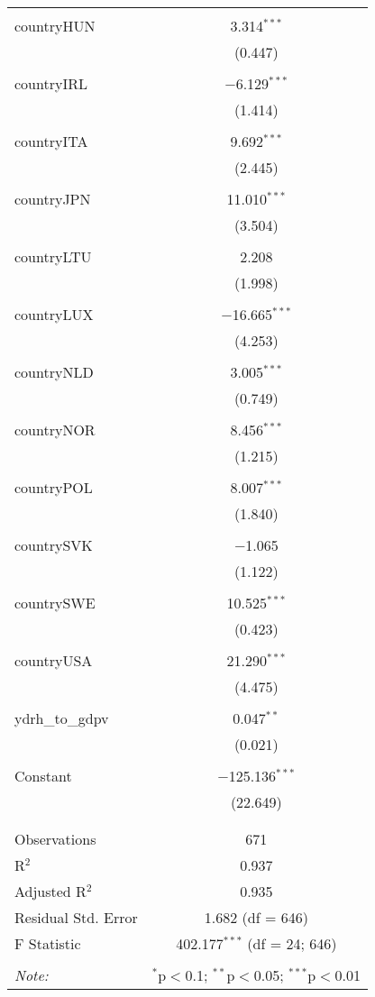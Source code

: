 \begin{table}[!htbp]
\begin{tabular}{@{\extracolsep{5pt}}lc}
  & \\ 
 countryHUN & 3.314$^{***}$ \\ 
  & (0.447) \\ 
  & \\ 
 countryIRL & $-$6.129$^{***}$ \\ 
  & (1.414) \\ 
  & \\ 
 countryITA & 9.692$^{***}$ \\ 
  & (2.445) \\ 
  & \\ 
 countryJPN & 11.010$^{***}$ \\ 
  & (3.504) \\ 
  & \\ 
 countryLTU & 2.208 \\ 
  & (1.998) \\ 
  & \\ 
 countryLUX & $-$16.665$^{***}$ \\ 
  & (4.253) \\ 
  & \\ 
 countryNLD & 3.005$^{***}$ \\ 
  & (0.749) \\ 
  & \\ 
 countryNOR & 8.456$^{***}$ \\ 
  & (1.215) \\ 
  & \\ 
 countryPOL & 8.007$^{***}$ \\ 
  & (1.840) \\ 
  & \\ 
 countrySVK & $-$1.065 \\ 
  & (1.122) \\ 
  & \\ 
 countrySWE & 10.525$^{***}$ \\ 
  & (0.423) \\ 
  & \\ 
 countryUSA & 21.290$^{***}$ \\ 
  & (4.475) \\ 
  & \\ 
 ydrh\_to\_gdpv & 0.047$^{**}$ \\ 
  & (0.021) \\ 
  & \\ 
 Constant & $-$125.136$^{***}$ \\ 
  & (22.649) \\ 
  & \\ 
\hline \\[-1.8ex] 
Observations & 671 \\ 
R$^{2}$ & 0.937 \\ 
Adjusted R$^{2}$ & 0.935 \\ 
Residual Std. Error & 1.682 (df = 646) \\ 
F Statistic & 402.177$^{***}$ (df = 24; 646) \\ 
\hline 
\hline \\[-1.8ex] 
\textit{Note:}  & \multicolumn{1}{r}{$^{*}$p$<$0.1; $^{**}$p$<$0.05; $^{***}$p$<$0.01} \\ 
\end{tabular} 
\end{table} 
